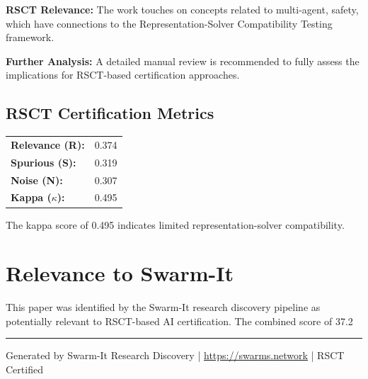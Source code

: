 \documentclass[11pt,a4paper]{article}
\begin{document}
\textbf{RSCT Relevance:} The work touches on concepts related to multi-agent, safety, which have connections to the Representation-Solver Compatibility Testing framework.

\textbf{Further Analysis:} A detailed manual review is recommended to fully assess the implications for RSCT-based certification approaches.


\subsection*{RSCT Certification Metrics}
\begin{tabular}{ll}
\textbf{Relevance (R):} & 0.374 \\
\textbf{Spurious (S):} & 0.319 \\
\textbf{Noise (N):} & 0.307 \\
\textbf{Kappa ($\kappa$):} & 0.495 \\
\end{tabular}

The kappa score of 0.495 indicates limited representation-solver compatibility.


\section{Relevance to Swarm-It}
This paper was identified by the Swarm-It research discovery pipeline as potentially relevant to RSCT-based AI certification. The combined score of 37.2%

\vspace{1em}
\hrule
\vspace{0.5em}
\small{Generated by Swarm-It Research Discovery | \url{https://swarms.network} | RSCT Certified}
\end{document}
